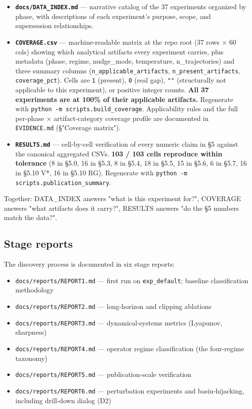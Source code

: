 \documentclass{article}
\theoremstyle{plain}
\theoremstyle{definition}
\begin{document}
\begin{itemize}
  \item \textbf{\texttt{docs/DATA\_INDEX.md}} — narrative catalog of the 37 experiments
  organized by phase, with descriptions of each experiment's purpose,
  scope, and supersession relationships.
  \item \textbf{\texttt{COVERAGE.csv}} — machine-readable matrix at the repo root (37
  rows × 60 cols) showing which analytical artifacts every experiment
  carries, plus metadata (phase, regime, nudge\_mode, temperature,
  n\_trajectories) and three summary columns (\texttt{n\_applicable\_artifacts},
  \texttt{n\_present\_artifacts}, \texttt{coverage\_pct}). Cells are \texttt{1} (present), \texttt{0}
  (real gap), \texttt{""} (structurally not applicable to this experiment), or
  positive integer counts. \textbf{All 37 experiments are at 100\% of their
  applicable artifacts.} Regenerate with
  \texttt{python -m scripts.build\_coverage}. Applicability rules and the full
  per-phase × artifact-category coverage profile are documented in
  \texttt{EVIDENCE.md} (§"Coverage matrix").
  \item \textbf{\texttt{RESULTS.md}} — cell-by-cell verification of every numeric claim
  in §5 against the canonical aggregated CSVs. \textbf{103 / 103 cells
  reproduce within tolerance} (8 in §5.0, 16 in §5.3, 8 in §5.4, 18
  in §5.5, 15 in §5.6, 6 in §5.7, 16 in §5.10 V*, 16 in §5.10 RG).
  Regenerate with \texttt{python -m scripts.publication\_summary}.
\end{itemize}

Together: DATA\_INDEX answers "what is this experiment for?", COVERAGE
answers "what artifacts does it carry?", RESULTS answers "do the §5
numbers match the data?".

\subsection{Stage reports}

The discovery process is documented in six stage reports:

\begin{itemize}
  \item \texttt{docs/reports/REPORT1.md} — first run on \texttt{exp\_default}; baseline
  classification methodology
  \item \texttt{docs/reports/REPORT2.md} — long-horizon and clipping ablations
  \item \texttt{docs/reports/REPORT3.md} — dynamical-systems metrics (Lyapunov,
  sharpness)
  \item \texttt{docs/reports/REPORT4.md} — operator regime classification (the
  four-regime taxonomy)
  \item \texttt{docs/reports/REPORT5.md} — publication-scale verification
  \item \texttt{docs/reports/REPORT6.md} — perturbation experiments and
  basin-hijacking, including drill-down dialog (D2)
\end{itemize}
\end{document}
